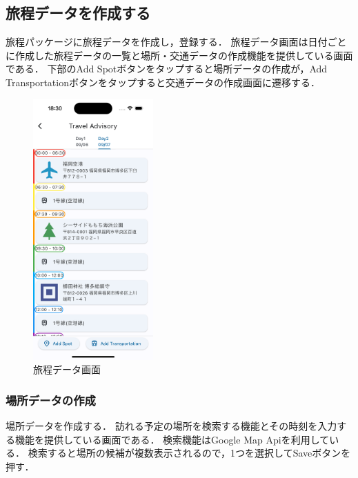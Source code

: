 \subsection {旅程データを作成する}
旅程パッケージに旅程データを作成し，登録する．
旅程データ画面は日付ごとに作成した旅程データの一覧と場所・交通データの作成機能を提供している画面である．
下部のAdd Spotボタンをタップすると場所データの作成が，Add Transportationボタンをタップすると交通データの作成画面に遷移する．

\begin{figure}[H]
  \centering
  \includegraphics[height=10cm]{./fig/travel_data_list.png}
  \caption{旅程データ画面}
  \label{fig:travel_data_list}
\end{figure}

\subsubsection {場所データの作成}
場所データを作成する．
訪れる予定の場所を検索する機能とその時刻を入力する機能を提供している画面である．
検索機能はGoogle Map Apiを利用している．
検索すると場所の候補が複数表示されるので，1つを選択してSaveボタンを押す．

